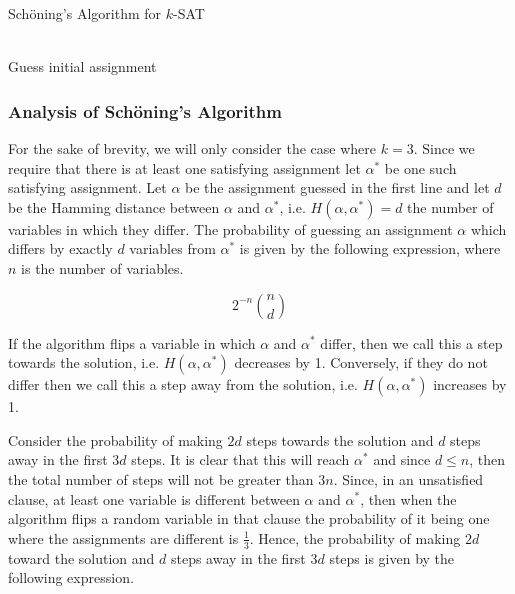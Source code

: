 \begin{algorithm}
\caption{Sch\"oning's Algorithm for $k$-SAT}\label{alg:schoning}
\vspace{5pt}
\hrulefill \\
\nl Guess initial assignment \\
\nl {}
\end{algorithm}

\subsubsection{Analysis of Sch\"oning's Algorithm}
For the sake of brevity, we will only consider the case where $k=3$.
Since we require that there is at least one satisfying assignment let $\alpha^*$
be one such satisfying assignment. Let $\alpha$ be the assignment guessed in
the first line and let $d$ be the Hamming distance between $\alpha$ and $\alpha^*$,
i.e. $H(\alpha, \alpha^*) = d$ the number of variables in which they differ. The probability of guessing
an assignment $\alpha$ which differs by exactly $d$ variables from $\alpha^*$ is given by the following expression,
where $n$ is the number of variables.

\begin{equation}
    2^{-n}\binom{n}{d}
\end{equation}

If the algorithm flips a variable in which $\alpha$ and $\alpha^*$ differ, then
we call this a step towards the solution, i.e. $H(\alpha, \alpha^*)$ decreases by 1. Conversely, if they do not differ then
we call this a step away from the solution, i.e. $H(\alpha, \alpha^*)$ increases by 1.

Consider the probability of making $2d$ steps towards the solution
and $d$ steps away in the first $3d$ steps. It is clear that this will reach
$\alpha^*$ and since $d \leq n$, then the total number of steps 
will not be greater than $3n$. Since, in an unsatisfied clause,
at least one variable is different between $\alpha$ and $\alpha^*$, then when
the algorithm flips a random variable in that clause the probability of it
being one where the assignments are different is $\frac{1}{3}$. Hence,
the probability of making $2d$ toward the solution and $d$ steps away in the
first $3d$ steps is given by the following expression.

